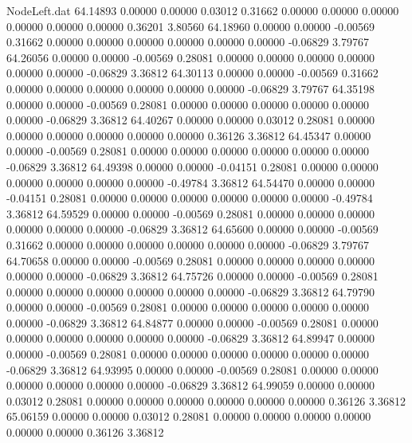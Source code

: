 \begin{filecontents}{NodeLeft.dat}
  64.14893    0.00000    0.00000     0.03012    0.31662    0.00000    0.00000    0.00000    0.00000    0.00000    0.00000    0.36201    3.80560
  64.18960    0.00000    0.00000    -0.00569    0.31662    0.00000    0.00000    0.00000    0.00000    0.00000    0.00000   -0.06829    3.79767
  64.26056    0.00000    0.00000    -0.00569    0.28081    0.00000    0.00000    0.00000    0.00000    0.00000    0.00000   -0.06829    3.36812
  64.30113    0.00000    0.00000    -0.00569    0.31662    0.00000    0.00000    0.00000    0.00000    0.00000    0.00000   -0.06829    3.79767
  64.35198    0.00000    0.00000    -0.00569    0.28081    0.00000    0.00000    0.00000    0.00000    0.00000    0.00000   -0.06829    3.36812
  64.40267    0.00000    0.00000     0.03012    0.28081    0.00000    0.00000    0.00000    0.00000    0.00000    0.00000    0.36126    3.36812
  64.45347    0.00000    0.00000    -0.00569    0.28081    0.00000    0.00000    0.00000    0.00000    0.00000    0.00000   -0.06829    3.36812
  64.49398    0.00000    0.00000    -0.04151    0.28081    0.00000    0.00000    0.00000    0.00000    0.00000    0.00000   -0.49784    3.36812
  64.54470    0.00000    0.00000    -0.04151    0.28081    0.00000    0.00000    0.00000    0.00000    0.00000    0.00000   -0.49784    3.36812
  64.59529    0.00000    0.00000    -0.00569    0.28081    0.00000    0.00000    0.00000    0.00000    0.00000    0.00000   -0.06829    3.36812
  64.65600    0.00000    0.00000    -0.00569    0.31662    0.00000    0.00000    0.00000    0.00000    0.00000    0.00000   -0.06829    3.79767
  64.70658    0.00000    0.00000    -0.00569    0.28081    0.00000    0.00000    0.00000    0.00000    0.00000    0.00000   -0.06829    3.36812
  64.75726    0.00000    0.00000    -0.00569    0.28081    0.00000    0.00000    0.00000    0.00000    0.00000    0.00000   -0.06829    3.36812
  64.79790    0.00000    0.00000    -0.00569    0.28081    0.00000    0.00000    0.00000    0.00000    0.00000    0.00000   -0.06829    3.36812
  64.84877    0.00000    0.00000    -0.00569    0.28081    0.00000    0.00000    0.00000    0.00000    0.00000    0.00000   -0.06829    3.36812
  64.89947    0.00000    0.00000    -0.00569    0.28081    0.00000    0.00000    0.00000    0.00000    0.00000    0.00000   -0.06829    3.36812
  64.93995    0.00000    0.00000    -0.00569    0.28081    0.00000    0.00000    0.00000    0.00000    0.00000    0.00000   -0.06829    3.36812
  64.99059    0.00000    0.00000     0.03012    0.28081    0.00000    0.00000    0.00000    0.00000    0.00000    0.00000    0.36126    3.36812
  65.06159    0.00000    0.00000     0.03012    0.28081    0.00000    0.00000    0.00000    0.00000    0.00000    0.00000    0.36126    3.36812

\end{filecontents}
